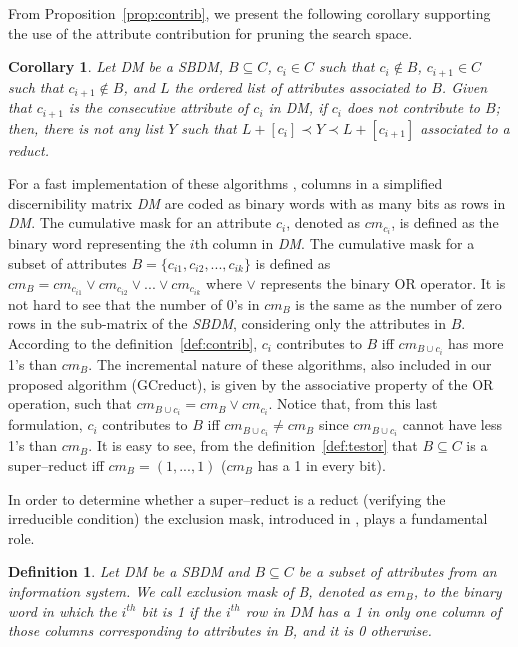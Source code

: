 \documentclass[number,preprint,review,12pt]{elsarticle}
\newtheorem{definition}{Definition}
\newtheorem{corollary}{Corollary}
\begin{document}
	From Proposition~\ref{prop:contrib}, we present the following corollary supporting the use of the attribute contribution for pruning the search space.
	
	\begin{corollary}\label{coro:contrib} 
		Let DM be a SBDM, $B \subseteq C$,  $c_i \in C$ such that $c_i \notin B$, $c_{i+1} \in C$ such that $c_{i+1} \notin B$, and $L$ the ordered list of attributes associated to $B$. Given that $c_{i+1}$ is the consecutive attribute of $c_i$ in DM, if $c_i$ does not contribute to $B$; then, there is not any list $Y$ such that $L+[c_i] \prec Y \prec L+[c_{i+1}]$ associated to a reduct.
	\end{corollary}
	
	For a fast implementation of these algorithms \citep{Sanchez10,Lias13}, columns in a simplified discernibility matrix \textit{DM} are coded as binary words with as many bits as rows in \textit{DM}. The cumulative mask for an attribute $c_i$, denoted as $cm_{c_i}$, is defined as the binary word representing the $i$th column in \textit{DM}. The cumulative mask for a subset of attributes $B=\lbrace c_{i1},c_{i2},...,c_{ik} \rbrace$ is defined	as $cm_B = cm_{c_{i1}} \vee cm_{c_{i2}} \vee ... \vee cm_{c_{ik}}$ where $\vee$ represents the binary OR operator. It is not hard to see that the number of 0's in $cm_B$ is the same as the number of zero rows in the sub-matrix of the \textit{SBDM}, considering only the attributes in $B$. According to the definition~\ref{def:contrib}, $c_i$ contributes to $B$ iff $cm_{B\cup c_i}$ has more 1's than $cm_B$. The incremental nature of these algorithms, also included in  our proposed algorithm (GCreduct), is given by the associative property of the OR operation, such that  $cm_{B\cup c_i}=cm_B\vee cm_{c_i}$. Notice that, from this last formulation, $c_i$ contributes to $B$ iff $cm_{B\cup c_i}\neq cm_B$ since $cm_{B\cup c_i}$ cannot have less 1's than $cm_B$. It is easy to see, from the definition~\ref{def:testor} that $B \subseteq C$ is a super--reduct iff $cm_B=(1,...,1)$ ($cm_B$ has a 1 in every bit).
	
	In order to determine whether a super--reduct is a reduct (verifying the irreducible condition) the
	exclusion mask, introduced in \cite{Lias09}, plays a fundamental role. 
	
	\begin{definition}\label{def:exclusion}
		Let DM be a SBDM and $B \subseteq C$ be a subset of attributes from an information system. We call exclusion mask of B, denoted as $em_B$, to the binary word in which the $i^{\mathit{th}}$ bit is 1 if the $i^{\mathit{th}}$ row in DM has a 1 in only one column of those columns corresponding to attributes in B, and it is 0 otherwise.
	\end{definition}
	
\end{document}
